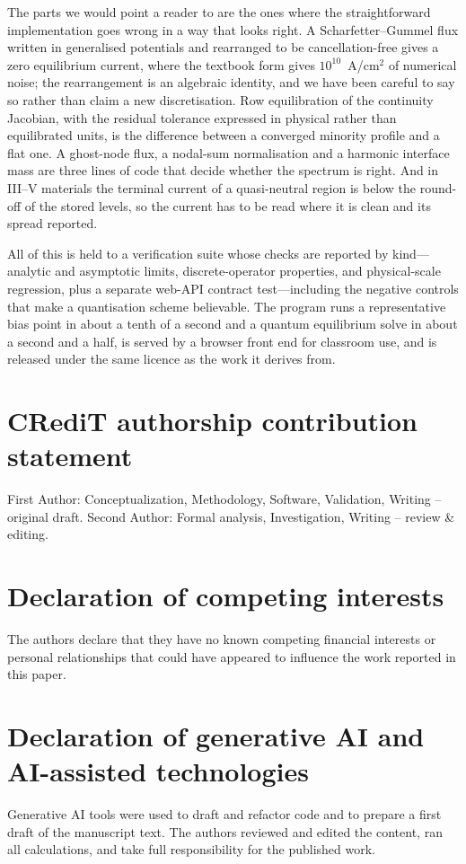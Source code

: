 \documentclass[preprint,12pt]{elsarticle}
\begin{document}
The parts we would point a reader to are the ones where the straightforward
implementation goes wrong in a way that looks right. A Scharfetter--Gummel flux
written in generalised potentials and rearranged to be cancellation-free gives
a zero equilibrium current, where the textbook form gives
$10^{10}$~A/cm$^2$ of numerical noise; the rearrangement is an algebraic
identity, and we have been careful to say so rather than claim a new
discretisation. Row equilibration of the continuity
Jacobian, with the residual tolerance expressed in physical rather than
equilibrated units, is the difference between a converged minority profile and
a flat one. A ghost-node flux, a nodal-sum normalisation and a harmonic
interface mass are three lines of code that decide whether the spectrum is
right. And in III--V materials the terminal current of a quasi-neutral region
is below the round-off of the stored levels, so the current has to be read
where it is clean and its spread reported.

All of this is held to a verification suite whose checks are reported by
kind---analytic and asymptotic limits, discrete-operator properties, and
physical-scale regression, plus a separate web-API contract test---including
the negative controls that make a quantisation scheme believable. The
program runs a representative bias point in about a tenth of a second and a
quantum equilibrium solve in about a second and a half, is served by a
browser front end for classroom use, and is released under the same licence as
the work it derives from.

\section*{CRediT authorship contribution statement}
First Author: Conceptualization, Methodology, Software, Validation, Writing --
original draft. Second Author: Formal analysis, Investigation, Writing --
review \& editing.

\section*{Declaration of competing interests}
The authors declare that they have no known competing financial interests or
personal relationships that could have appeared to influence the work reported
in this paper.

\section*{Declaration of generative AI and AI-assisted technologies}
Generative AI tools were used to draft and refactor code and to prepare a
first draft of the manuscript text. The authors reviewed and edited the
content, ran all calculations, and take full responsibility for the published
work.
\end{document}

